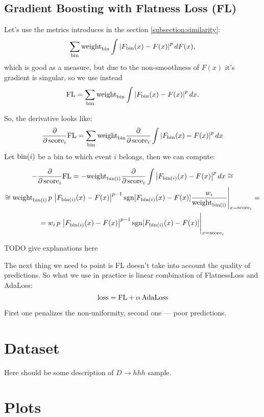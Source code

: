 \documentclass[12pt]{article}
\theoremstyle{definition}
\theoremstyle{remark}
\newcommand{\abs}[1]{\left\vert#1\right\vert}
\newcommand{\sgn}{\operatorname{sgn}}
\begin{document}
\subsection{Gradient Boosting with Flatness Loss (FL)}

Let's use the metrics introduces in the section \ref{subsection:similarity}:
\[
	\sum_{\bin} \binweight \int \abs{F_{\bin}(x) - F(x)}^p dF(x),
\]
which is good as a measure, but due to the non-smoothness of $F(x)$ it's 
gradient is singular, so we use instead
\[
	\FL = \sum_{\bin} \binweight \int \abs{F_{\bin}(x) - F(x)}^p dx.
\]

So, the derivative looks like:
\[
	\dfrac{\partial} {\partial \, \score_i} \FL
	= \sum_{\bin} \binweight \frac{\partial }{ \partial \, \score_i} 
			\int \abs{F_\bin(x) - F(x)}^p dx
\]
Let $\text{bin}(i)$ be a bin to which event $i$ belongs, then we can compute:
\def\binIweight{\text{weight}_\text{\bin(i)}}


\begin{multline*}
	- \dfrac{\partial} {\partial \, \score_i} \FL = 
		- \binIweight
		\frac{\partial }{ \partial \, \score_i} 
			\int \abs{F_{\bin(i)}(x) - F(x)}^p dx \cong \\
	\cong \binIweight \, p \,  \abs{F_{\bin(i)}(x) - F(x)}^{p-1} 
		\sgn[F_{\bin(i)}(x) - F(x)]
		\dfrac{w_i}{\binIweight}
		\Bigg|_{x=\score_i} = \\
	= 
		w_i \, p \,  \abs{F_{\bin(i)}(x) - F(x)}^{p-1}
		\sgn[F_{\bin(i)}(x) - F(x)]
		\Bigg|_{x=\score_i}
\end{multline*}

TODO give explanations here

The next thing we need to point is FL doesn't take into account the quality of predictions. So what we use in practice is linear combination of FlatnessLoss and AdaLoss:
\[
	\text{loss} = \text{FL} + \alpha \, \text{AdaLoss}
\]

First one penalizes the non-uniformity, second one --- poor predictions.

\section{Dataset}

Here should be some description of $D \to hhh$ sample.

\section{Plots}
\end{document}
